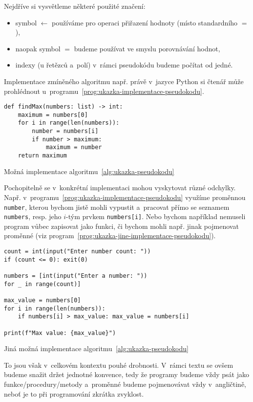 Nejdříve si vysvětleme některé použité značení:
\begin{itemize}
    \item symbol $\gets$ používáme pro operaci přiřazení hodnoty (místo standardního $=$),
    \item naopak symbol $=$ budeme používat ve smyslu porovnávání hodnot,
    \item indexy (u řetězců a~polí) v~rámci pseudokódu budeme počítat od jedné.
\end{itemize}
Implementace zmíněného algoritmu např. právě v~jazyce Python si čtenář může prohlédnout u~programu~\ref{prog:ukazka-implementace-pseudokodu}.
\begin{program}[h]
\begin{lstlisting}[style=python]
def findMax(numbers: list) -> int:
    maximum = numbers[0]
    for i in range(len(numbers)):
        number = numbers[i]
        if number > maximum:
            maximum = number
    return maximum
\end{lstlisting}
    \caption{Možná implementace algoritmu~\ref{alg:ukazka-pseudokodu}}
    \label{prog:ukazka-implementace-pseudokodu}
\end{program}
Pochopitelně se v~konkrétní implementaci mohou vyskytovat různé odchylky. Např. v~programu~\ref{prog:ukazka-implementace-pseudokodu} využíme proměnnou \texttt{number}, kterou bychom jistě mohli vypustit a~pracovat přímo se seznamem \texttt{numbers}, resp. jeho $i$-tým prvkem \texttt{numbers[i]}. Nebo bychom například nemuseli program vůbec zapisovat jako funkci, či bychom mohli např. jinak pojmenovat proměnné (viz program~\ref{prog:ukazka-jine-implementace-pseudokodu}).
\begin{program}[h]
\begin{lstlisting}[style=python]
count = int(input("Enter number count: "))
if (count <= 0): exit(0)

numbers = [int(input("Enter a number: "))
for _ in range(count)]

max_value = numbers[0]
for i in range(len(numbers)):
    if numbers[i] > max_value: max_value = numbers[i]

print(f"Max value: {max_value}")
\end{lstlisting}
    \caption{Jiná možná implementace algoritmu~\ref{alg:ukazka-pseudokodu}}
    \label{prog:ukazka-jine-implementace-pseudokodu}
    \end{program}
To jsou však v~celkovém kontextu pouhé drobnosti. V~rámci textu se ovšem budeme snažit držet jednotné konvence, tedy že programy budeme vždy psát jako funkce/procedury/metody a~proměnné budeme pojmenovávat vždy v~angličtině, neboť je to při programování zkrátka zvyklost.
